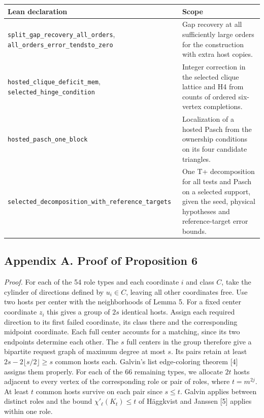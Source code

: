 \documentclass[english,11pt,a4paper]{article}
\newcounter{none}
\begin{document}
{\def\LTcaptype{none} %
\begin{longtable}[]{@{}
  >{\raggedright\arraybackslash}p{}
  >{\raggedright\arraybackslash}p{}@{}}
\toprule\noalign{}
\begin{minipage}[b]{\linewidth}\raggedright
Lean declaration
\end{minipage} & \begin{minipage}[b]{\linewidth}\raggedright
Scope
\end{minipage} \\
\midrule\noalign{}
\endhead
\bottomrule\noalign{}
\endlastfoot
\nolinkurl{split_gap_recovery_all_orders}, \nolinkurl{all_orders_error_tendsto_zero} & Gap recovery at all sufficiently large orders for the construction with extra host copies. \\
\nolinkurl{hosted_clique_deficit_mem}, \nolinkurl{selected_hinge_condition} & Integer correction in the selected clique lattice and H4 from counts of ordered six-vertex completions. \\
\nolinkurl{hosted_pasch_one_block} & Localization of a hosted Pasch from the ownership conditions on its four candidate triangles. \\
\nolinkurl{selected_decomposition_with_reference_targets} & One T+ decomposition for all tests and Pasch on a selected support, given the seed, physical hypotheses and reference-target error bounds. \\
\end{longtable}
}

\subsection{Appendix A. Proof of Proposition 6}\label{appendix-a.-proof-of-proposition-6}

\emph{Proof.} For each of the 54 role types and each coordinate \(i\) and class \(C\), take the cylinder of directions defined by \(u_i\in C\), leaving all other coordinates free. Use two hosts per center with the neighborhoods of Lemma 5. For a fixed center coordinate \(z_i\) this gives a group of \(2s\) identical hosts. Assign each required direction to its first failed coordinate, its class there and the corresponding midpoint coordinate. Each full center accounts for a matching, since its two endpoints determine each other. The \(s\) full centers in the group therefore give a bipartite request graph of maximum degree at most \(s\). Its pairs retain at least \(2s-2\lfloor s/2\rfloor\ge s\) common hosts each. Galvin's list edge-coloring theorem {[}4{]} assigns them properly. For each of the 66 remaining types, we allocate \(2t\) hosts adjacent to every vertex of the corresponding role or pair of roles, where \(t=m^{2j}\). At least \(t\) common hosts survive on each pair since \(s\le t\). Galvin applies between distinct roles and the bound \(\chi'_\ell(K_t)\le t\) of Häggkvist and Janssen {[}5{]} applies within one role.
\end{document}
